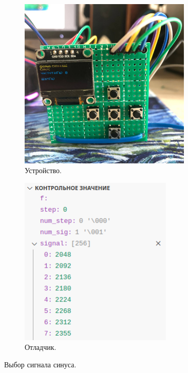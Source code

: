 	\begin{figure}[H]
     \begin{subfigure}[H]{0.5\textwidth}
         \centering
         \includegraphics[width=0.9\textwidth]{../image/test1_u_s.jpg}
         \caption{Устройство.}
     \end{subfigure}
     \hfill
     \begin{subfigure}[H]{0.5\textwidth}
         \centering
         \includegraphics[width=0.8\textwidth]{../image/test1_o_s.png}
         \caption{Отладчик.}
     \end{subfigure}
        \caption{Выбор сигнала синуса.}
	\end{figure}
	
